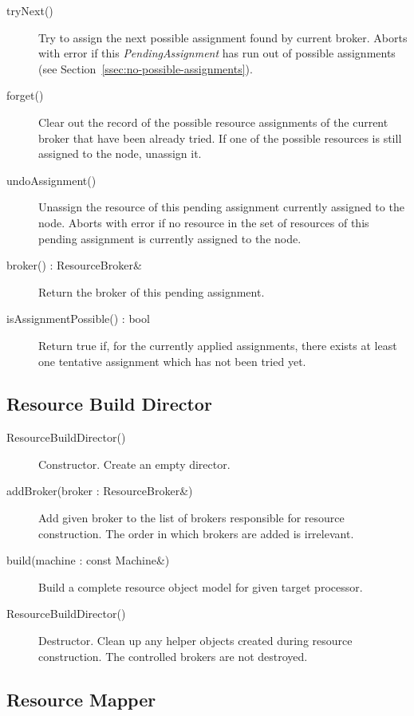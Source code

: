 \documentclass[a4paper,twoside]{tce}
\begin{document}
\begin{description}
\item[tryNext()]%
  Try to assign the next possible assignment found by current broker. Aborts
  with error if this \emph{PendingAssignment} has run out of possible
  assignments (see Section~\ref{ssec:no-possible-assignments}).
\item[forget()]%
  Clear out the record of the possible resource assignments of the current
  broker that have been already tried. If one of the possible resources is
  still assigned to the node, unassign it.
\item[undoAssignment()]%
  Unassign the resource of this pending assignment currently assigned to the
  node. Aborts with error if no resource in the set of resources of this
  pending assignment is currently assigned to the node.
\item[broker() : ResourceBroker\&]%
  Return the broker of this pending assignment.
\item[isAssignmentPossible() : bool]%
  Return true if, for the currently applied assignments, there exists at
  least one tentative assignment which has not been tried yet.
\end{description}

\subsection{Resource Build Director}
\label{ssec:ResourceBuildDirector-if}

\begin{description}
\item[ResourceBuildDirector()]%
  Constructor. Create an empty director.
\item[addBroker(broker : ResourceBroker\&)]%
  Add given broker to the list of brokers responsible for resource
  construction. The order in which brokers are added is irrelevant.
\item[build(machine : const Machine\&)]%
  Build a complete resource object model for given target processor.
\item[\texttilde{}ResourceBuildDirector()]%
  Destructor. Clean up any helper objects created during resource
  construction. The controlled brokers are not destroyed.
\end{description}

\subsection{Resource Mapper}
\label{ssec:ResourceMapper-if}
\end{document}
